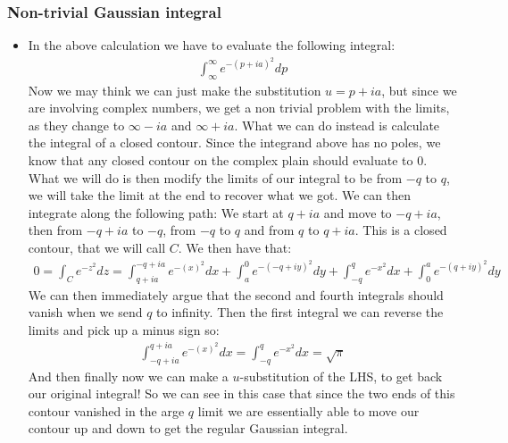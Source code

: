 \documentclass[11pt]{article}
\numberwithin{equation}{section}
\begin{document}
\subsubsection{Non-trivial Gaussian integral}
\begin{itemize}
  \item In the above calculation we have to evaluate the following integral: 
  \begin{align*}
    \int_{\infty}^{\infty}e^{-(p+ia)^2}dp 
  \end{align*}
  Now we may think we can just make the substitution $u=p+ia$, but since we are involving complex numbers, we get a non trivial problem with the limits, as they change to $\infty-ia$ and $\infty+ia$. What we can do instead is calculate the integral of a closed contour. Since the integrand above has no poles, we know that any closed contour on the complex plain should evaluate to 0. What we will do is then modify the limits of our integral to be from $-q$ to $q$, we will take the limit at the end to recover what we got. We can then integrate along the following path: We start at $q+ia$ and move to $-q+ia$, then from $-q+ia$ to $-q$, from  $-q$ to $q$ and from $q$ to $q+ia$. This is a closed contour, that we will call $C$. We then have that:
  \begin{align*}
        0=\int_{C}e^{-z^2}dz = \int_{q+ia}^{-q+ia}e^{-(x)^2}dx+\int_{a}^{0}e^{-(-q+iy)^2}dy+\int_{-q}^{q}e^{-x^2}dx+\int_{0}^{a}e^{-(q+iy)^2}dy
     \end{align*}  
     We can then immediately argue that the second and fourth integrals should vanish when we send $q$ to infinity. Then the first integral we can reverse the limits and pick up a minus sign so: 
     \begin{align*}
        \int_{-q+ia}^{q+ia}e^{-(x)^2}dx = \int_{-q}^{q}e^{-x^2}dx = \sqrt{\pi}
      \end{align*} 
      And then finally now we can make a $u$-substitution of the LHS, to get back our original integral! So we can see in this case that since the two ends of this contour vanished in the arge $q$ limit we are essentially able to move our contour up and down to get the regular Gaussian integral.  
\end{itemize}
\end{document}
